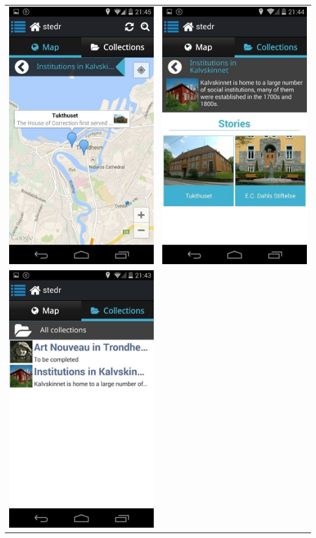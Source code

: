 \documentclass[12pt,a4paper,titlepage]{article}
\begin{document}
\begin{appendices}
\begin{center}
\begin{tabular}{cc}
	 	\includegraphics[width=0.35 \textwidth]{res/ScreenShot1.jpg}	& 	
	 	\includegraphics[width=0.35 \textwidth]{res/ScreenShot2.jpg}\\
	 	\includegraphics[width=0.35 \textwidth]{res/ScreenShot3.jpg}	&

\end{tabular}
\end{center}
\end{appendices}
\end{document}
